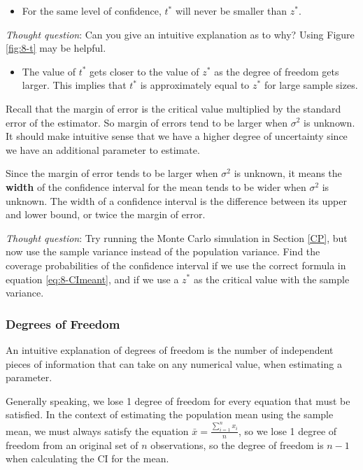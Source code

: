 \documentclass[
]{book}
\providecommand{\tightlist}{%
  \setlength{\itemsep}{0pt}\setlength{\parskip}{0pt}}
\begin{document}
\begin{itemize}
\tightlist
\item
  For the same level of confidence, \(t^*\) will never be smaller than \(z^*\).
\end{itemize}

\emph{Thought question}: Can you give an intuitive explanation as to why? Using Figure \ref{fig:8-t} may be helpful.

\begin{itemize}
\tightlist
\item
  The value of \(t^*\) gets closer to the value of \(z^*\) as the degree of freedom gets larger. This implies that \(t^*\) is approximately equal to \(z^*\) for large sample sizes.
\end{itemize}

Recall that the margin of error is the critical value multiplied by the standard error of the estimator. So margin of errors tend to be larger when \(\sigma^2\) is unknown. It should make intuitive sense that we have a higher degree of uncertainty since we have an additional parameter to estimate.

Since the margin of error tends to be larger when \(\sigma^2\) is unknown, it means the \textbf{width} of the confidence interval for the mean tends to be wider when \(\sigma^2\) is unknown. The width of a confidence interval is the difference between its upper and lower bound, or twice the margin of error.

\emph{Thought question}: Try running the Monte Carlo simulation in Section \ref{CP}, but now use the sample variance instead of the population variance. Find the coverage probabilities of the confidence interval if we use the correct formula in equation \eqref{eq:8-CImeant}, and if we use a \(z^*\) as the critical value with the sample variance.

\hypertarget{df}{%
\subsubsection{Degrees of Freedom}\label{df}}

An intuitive explanation of degrees of freedom is the number of independent pieces of information that can take on any numerical value, when estimating a parameter.

Generally speaking, we lose 1 degree of freedom for every equation that must be satisfied. In the context of estimating the population mean using the sample mean, we must always satisfy the equation \(\bar{x} = \frac{\sum_{i=1}^n x_i}{n}\), so we lose 1 degree of freedom from an original set of \(n\) observations, so the degree of freedom is \(n-1\) when calculating the CI for the mean.
\end{document}
